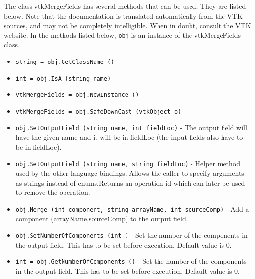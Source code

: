 The class vtkMergeFields has several methods that can be used.
  They are listed below.
Note that the documentation is translated automatically from the VTK sources,
and may not be completely intelligible.  When in doubt, consult the VTK website.
In the methods listed below, \verb|obj| is an instance of the vtkMergeFields class.
\begin{itemize}
\item  \verb|string = obj.GetClassName ()|

\item  \verb|int = obj.IsA (string name)|

\item  \verb|vtkMergeFields = obj.NewInstance ()|

\item  \verb|vtkMergeFields = obj.SafeDownCast (vtkObject o)|

\item  \verb|obj.SetOutputField (string name, int fieldLoc)| -  The output field will have the given name and it will be in
 fieldLoc (the input fields also have to be in fieldLoc).

\item  \verb|obj.SetOutputField (string name, string fieldLoc)| -  Helper method used by the other language bindings. Allows the caller to
 specify arguments as strings instead of enums.Returns an operation id 
 which can later be used to remove the operation.

\item  \verb|obj.Merge (int component, string arrayName, int sourceComp)| -  Add a component (arrayName,sourceComp) to the output field.

\item  \verb|obj.SetNumberOfComponents (int )| -  Set the number of the components in the output field.
 This has to be set before execution. Default value is 0.

\item  \verb|int = obj.GetNumberOfComponents ()| -  Set the number of the components in the output field.
 This has to be set before execution. Default value is 0.

\end{itemize}
